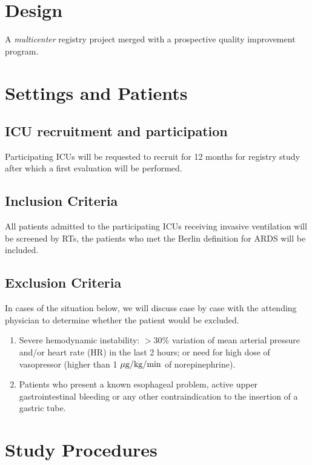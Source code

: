 \documentclass[11pt]{article} %
\begin{document}
\section{Design}
A \textit{multicenter} registry project merged with a prospective quality improvement program.

\section{Settings and Patients}
\subsection{ICU recruitment and participation}
Participating ICUs will be requested to recruit for 12 months for registry study after which a first evaluation will be performed. 

\subsection{Inclusion Criteria}
All patients admitted to the participating ICUs receiving invasive ventilation will be screened by RTs, the patients who met the Berlin definition for ARDS will be included.
\subsection{Exclusion Criteria}
In cases of the situation below, we will discuss case by case with the attending physician to determine whether the patient would be excluded.
\begin{enumerate}[label=(\alph*)]
\item Severe hemodynamic instability: $ >30\% $ variation of mean arterial pressure and/or heart rate (HR) in the last 2 hours; or need for high dose of vasopressor (higher than 1 $\rm{\mu g/kg/min}$ of norepinephrine).
\item Patients who present a known esophageal problem, active upper gastrointestinal bleeding or any other contraindication to the insertion of a gastric tube.
\end{enumerate}

\section{Study Procedures}
\end{document}
